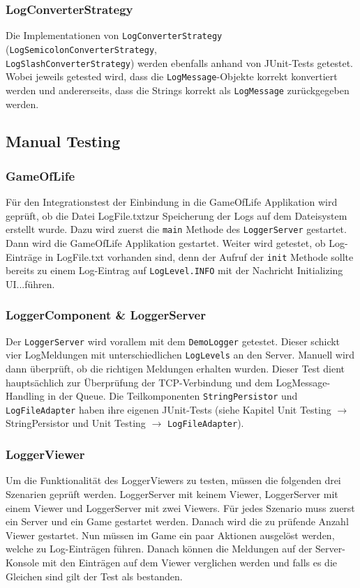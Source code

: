 \documentclass[12pt,a4paper,twosided]{scrartcl}
\begin{document}
\subsubsection{LogConverterStrategy}
Die Implementationen von \texttt{LogConverterStrategy} (\texttt{LogSemicolonConverterStrategy}, \\ \texttt{LogSlashConverterStrategy}) werden ebenfalls anhand von JUnit-Tests getestet. Wobei jeweils getested wird, dass die \texttt{LogMessage}-Objekte korrekt konvertiert werden und andererseits, dass die Strings korrekt als \texttt{LogMessage} zurückgegeben werden.

\subsection{Manual Testing}
\subsubsection{GameOfLife}
Für den Integrationstest der Einbindung in die GameOfLife Applikation wird geprüft, ob die Datei \glqq LogFile.txt\grqq zur Speicherung der Logs auf dem Dateisystem erstellt wurde. Dazu wird zuerst die \texttt{main} Methode des \texttt{LoggerServer} gestartet. Dann wird die GameOfLife Applikation gestartet. Weiter wird getestet, ob Log-Einträge in LogFile.txt vorhanden sind, denn der Aufruf der \texttt{init} Methode sollte bereits zu einem Log-Eintrag auf \texttt{LogLevel.INFO} mit der Nachricht \glqq Initializing UI...\grqq führen.

\subsubsection{LoggerComponent \& LoggerServer}
Der \texttt{LoggerServer} wird vorallem mit dem \texttt{DemoLogger} getestet. Dieser schickt vier LogMeldungen mit unterschiedlichen \texttt{LogLevels} an den Server. Manuell wird dann überprüft, ob die richtigen Meldungen erhalten wurden. Dieser Test dient hauptsächlich zur Überprüfung der TCP-Verbindung und dem LogMessage-Handling in der Queue. Die Teilkomponenten \texttt{StringPersistor} und \texttt{LogFileAdapter} haben ihre eigenen JUnit-Tests (siehe Kapitel Unit Testing $\rightarrow$ StringPersistor und Unit Testing $\rightarrow$ \texttt{LogFileAdapter}).

\subsubsection{LoggerViewer}
Um die Funktionalität des LoggerViewers zu testen, müssen die folgenden drei Szenarien geprüft werden. LoggerServer mit keinem Viewer, LoggerServer mit einem Viewer und LoggerServer mit zwei Viewers. Für jedes Szenario muss zuerst ein Server und ein Game gestartet werden. Danach wird die zu prüfende Anzahl Viewer gestartet. Nun müssen im Game ein paar Aktionen ausgelöst werden, welche zu Log-Einträgen führen. Danach können die Meldungen auf der Server-Konsole mit den Einträgen auf dem Viewer verglichen werden und falls es die Gleichen sind gilt der Test als bestanden.
\end{document}

